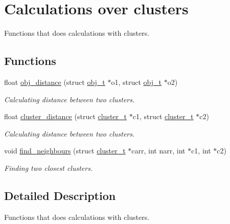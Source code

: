\hypertarget{group___cluster_calculations}{}\section{Calculations over clusters}
\label{group___cluster_calculations}


Functions that does calculations with clusters.  


\subsection*{Functions}
\begin{DoxyCompactItemize}
\item 
float \mbox{\hyperlink{group___cluster_calculations_ga703ce6afddf65026b68645bc5394405b}{obj\+\_\+distance}} (struct \mbox{\hyperlink{structobj__t}{obj\+\_\+t}} $\ast$o1, struct \mbox{\hyperlink{structobj__t}{obj\+\_\+t}} $\ast$o2)
\begin{DoxyCompactList}\small\item\em Calculating distance between two clusters. \end{DoxyCompactList}\item 
float \mbox{\hyperlink{group___cluster_calculations_gaf336f28a62c28da792f6def84f432bb2}{cluster\+\_\+distance}} (struct \mbox{\hyperlink{structcluster__t}{cluster\+\_\+t}} $\ast$c1, struct \mbox{\hyperlink{structcluster__t}{cluster\+\_\+t}} $\ast$c2)
\begin{DoxyCompactList}\small\item\em Calculating distance between two clusters. \end{DoxyCompactList}\item 
void \mbox{\hyperlink{group___cluster_calculations_ga5f16d682e7c859f7bd3f27697c2b7cc0}{find\+\_\+neighbours}} (struct \mbox{\hyperlink{structcluster__t}{cluster\+\_\+t}} $\ast$carr, int narr, int $\ast$c1, int $\ast$c2)
\begin{DoxyCompactList}\small\item\em Finding two closest clusters. \end{DoxyCompactList}\end{DoxyCompactItemize}


\subsection{Detailed Description}
Functions that does calculations with clusters. 



